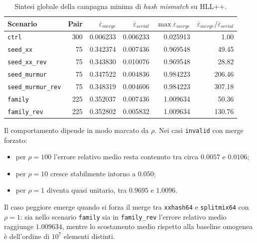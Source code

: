 \begin{table}[htbp]
    \centering
    \small
    \setlength{\tabcolsep}{5pt}
    \renewcommand{\arraystretch}{1.1}
    \begin{tabular}{|l|r|r|r|r|r|}
        \hline
        Scenario & Pair & \(\overline{\varepsilon}_{merge}\) & \(\overline{\varepsilon}_{serial}\) & \(\max \varepsilon_{merge}\) & \(\overline{\varepsilon}_{merge}/\overline{\varepsilon}_{serial}\) \\
        \hline
        \texttt{ctrl} & 300 & 0.006233 & 0.006233 & 0.025913 & 1.00 \\
        \hline
        \texttt{seed\_xx} & 75 & 0.342374 & 0.007436 & 0.969548 & 49.45 \\
        \hline
        \texttt{seed\_xx\_rev} & 75 & 0.343830 & 0.010076 & 0.969548 & 28.82 \\
        \hline
        \texttt{seed\_murmur} & 75 & 0.347522 & 0.004836 & 0.984223 & 206.46 \\
        \hline
        \texttt{seed\_murmur\_rev} & 75 & 0.348319 & 0.004606 & 0.984223 & 307.18 \\
        \hline
        \texttt{family} & 225 & 0.352037 & 0.007436 & 1.009634 & 50.36 \\
        \hline
        \texttt{family\_rev} & 225 & 0.352802 & 0.005832 & 1.009634 & 130.76 \\
        \hline
    \end{tabular}
    \caption{Sintesi globale della campagna minima di \emph{hash mismatch} su HLL++.}
    \label{tab:hllpp-hash-mismatch-summary}
\end{table}

Il comportamento dipende in modo marcato da \(\rho\). Nei casi
\texttt{invalid} con merge forzato:
\begin{itemize}
    \item per \(\rho = 100\) l'errore relativo medio resta contenuto tra circa
    \(0.0057\) e \(0.0106\);
    \item per \(\rho = 10\) cresce stabilmente intorno a \(0.050\);
    \item per \(\rho = 1\) diventa quasi unitario, tra \(0.9695\) e \(1.0096\).
\end{itemize}

Il caso peggiore emerge quando si forza il merge tra \texttt{xxhash64} e
\texttt{splitmix64} con \(\rho=1\): sia nello scenario \texttt{family} sia in
\texttt{family\_rev} l'errore relativo medio raggiunge \(1.009634\), mentre lo
scostamento medio rispetto alla baseline omogenea è dell'ordine di
\(10^7\) elementi distinti.

